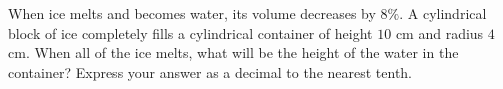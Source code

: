 When ice melts and becomes water, its volume decreases by $8\%$. A cylindrical block of ice completely fills a cylindrical container of height $10$ cm and radius $4$ cm. When all of the ice melts, what will be the height of the water in the container? Express your answer as a decimal to the nearest tenth.
